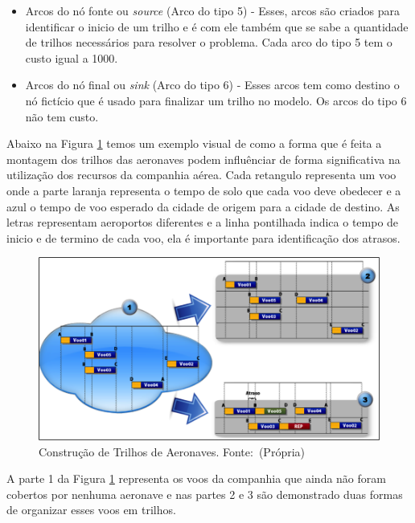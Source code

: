 \begin{itemize}
\begin{figure}[ht]
\end{figure}

\item Arcos do nó fonte ou \textit{source} (Arco do tipo 5) - Esses, arcos são
criados para identificar o inicio de um trilho e é com ele também que se sabe a
quantidade de trilhos necessários para resolver o problema. Cada arco do tipo 5
tem o custo igual a 1000.

\item Arcos do nó final ou \textit{sink} (Arco do tipo 6) - Esses arcos tem
como destino o nó fictício que é usado para finalizar um trilho no modelo. Os
arcos do tipo 6 não tem custo.

\end{itemize}

Abaixo na Figura \ref{fig:arpexample} temos um exemplo visual de como a forma
que é feita a montagem dos trilhos das aeronaves podem influênciar de forma
significativa na utilização dos recursos da companhia aérea. Cada
retangulo representa um voo onde a parte laranja representa o tempo de solo que
cada voo deve obedecer e a azul o tempo de voo esperado da cidade de origem para
a cidade de destino. As letras representam aeroportos diferentes e a linha
pontilhada indica o tempo de inicio e de termino de cada voo, ela é importante
para identificação dos atrasos.

\begin{figure}[ht]
	\caption{Construção de Trilhos de Aeronaves. \newline \mbox{Fonte: (Própria)}}
	\label{fig:arpexample}
	\includegraphics[scale=0.6]{./img/arpexample}
\end{figure}

A parte 1 da Figura \ref{fig:arpexample} representa os voos da companhia que
ainda não foram cobertos por nenhuma aeronave e nas partes 2 e 3 são
demonstrado duas formas de organizar esses voos em trilhos.

